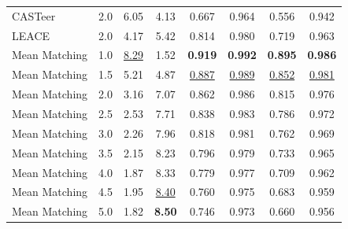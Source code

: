 \begin{table}[htbp]
\begin{tabular}{l|l|cccccc|}
CASTeer & 2.0 & 6.05 & 4.13 & 0.667 & 0.964 & 0.556 & 0.942 \\
LEACE & 2.0 & 4.17 & 5.42 & 0.814 & 0.980 & 0.719 & 0.963 \\
Mean Matching & 1.0 & \underline{8.29} & 1.52 & \textbf{0.919} & \textbf{0.992} & \textbf{0.895} & \textbf{0.986} \\
Mean Matching & 1.5 & 5.21 & 4.87 & \underline{0.887} & \underline{0.989} & \underline{0.852} & \underline{0.981} \\
Mean Matching & 2.0 & 3.16 & 7.07 & 0.862 & 0.986 & 0.815 & 0.976 \\
Mean Matching & 2.5 & 2.53 & 7.71 & 0.838 & 0.983 & 0.786 & 0.972 \\
Mean Matching & 3.0 & 2.26 & 7.96 & 0.818 & 0.981 & 0.762 & 0.969 \\
Mean Matching & 3.5 & 2.15 & 8.23 & 0.796 & 0.979 & 0.733 & 0.965 \\
Mean Matching & 4.0 & 1.87 & 8.33 & 0.779 & 0.977 & 0.709 & 0.962 \\
Mean Matching & 4.5 & 1.95 & \underline{8.40} & 0.760 & 0.975 & 0.683 & 0.959 \\
Mean Matching & 5.0 & 1.82 & \textbf{8.50} & 0.746 & 0.973 & 0.660 & 0.956 \\
\hline
\end{tabular}
\end{table}

